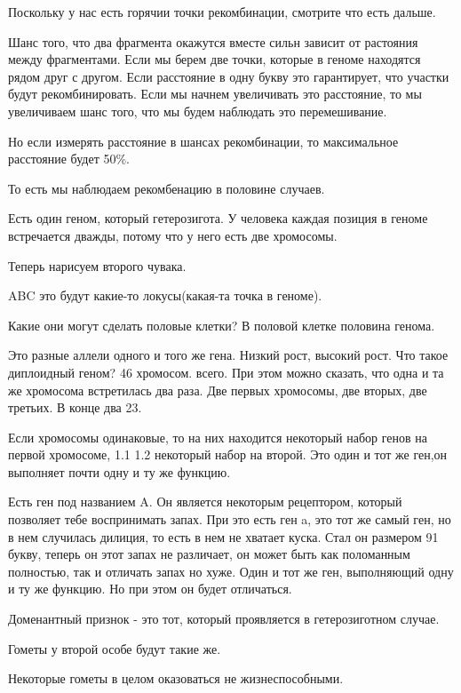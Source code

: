 Поскольку у нас есть горячии точки рекомбинации, смотрите что есть дальше. 

Шанс того, что два фрагмента окажутся вместе сильн зависит от растояния между фрагментами. 
Если мы берем две точки, которые в геноме находятся рядом друг с другом. Если расстояние в одну букву 
это гарантирует, что участки 
будут рекомбинировать. Если мы начнем увеличивать это расстояние, то мы увеличиваем шанс того, что мы будем наблюдать это перемешивание. 

Но если измерять расстояние в шансах рекомбинации, то максимальное расстояние будет 50\%.

То есть мы наблюдаем рекомбенацию в половине случаев.

Есть один геном, который гетерозигота. У человека каждая 
позиция в геноме встречается дважды, потому что 
у него есть две хромосомы. 

Теперь нарисуем второго чувака. 

ABC это будут какие-то локусы(какая-та точка в геноме). 

Какие они могут сделать половые клетки? 
В половой клетке половина генома. 

Это разные аллели одного и того же гена. Низкий рост, высокий рост. 
Что такое диплоидный геном? 46 хромосом. всего. При этом 
можно сказать, что одна и та же хромосома встретилась два раза. 
Две первых хромосомы, две вторых, две третьих. В конце два 23. 

Если хромосомы одинаковые, то на них находится некоторый набор генов на первой 
хромосоме, 
1.1
1.2 
некоторый набор на второй. Это один и тот же ген,он выполняет почти одну и ту же функцию. 

Есть ген под названием A. Он является некоторым рецептором, который 
позволяет тебе воспринимать запах. При это есть 
ген a, это тот же самый ген, но в нем случилась дилиция, то есть 
в нем не хватает куска. Стал он размером 91 букву, теперь 
он этот запах не различает, он может быть как 
поломанным полностью, так и отличать 
запах но хуже. Один и тот же ген, выполняющий одну и ту же 
функцию. Но при этом он будет отличаться. 

Доменантный признок - это тот, который 
проявляется в гетерозиготном случае. 

Гометы у второй особе будут такие же. 

Некоторые гометы в целом оказоваться не жизнеспособными. 


